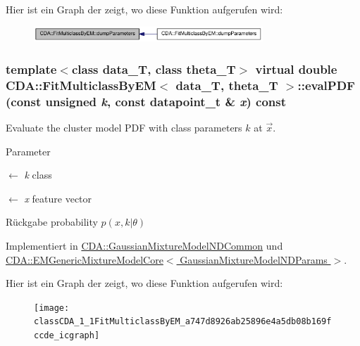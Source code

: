 Hier ist ein Graph der zeigt, wo diese Funktion aufgerufen wird:\nopagebreak
\begin{figure}[H]
\begin{center}
\leavevmode
\includegraphics[width=244pt]{classCDA_1_1FitMulticlassByEM_aa5598f1ced5c95045f59c99610ab53e5_icgraph}
\end{center}
\end{figure}


\hypertarget{classCDA_1_1FitMulticlassByEM_a747d8926ab25896e4a5db08b169fccde}{
\subsubsection[{evalPDF}]{\setlength{\rightskip}{0pt plus 5cm}template$<$class data\_\-T, class theta\_\-T$>$ virtual double {\bf CDA::FitMulticlassByEM}$<$ data\_\-T, theta\_\-T $>$::evalPDF (const unsigned {\em k}, \/  const datapoint\_\-t \& {\em x}) const}}
\label{classCDA_1_1FitMulticlassByEM_a747d8926ab25896e4a5db08b169fccde}


Evaluate the cluster model PDF with class parameters $k$ at $\vec{x}$. 


\begin{DoxyParams}{Parameter}
\item[\mbox{$\leftarrow$} {\em k}]class \item[\mbox{$\leftarrow$} {\em x}]feature vector\end{DoxyParams}
\begin{DoxyReturn}{Rückgabe}
probability $p(x,k\vert\theta)$ 
\end{DoxyReturn}


Implementiert in \hyperlink{classCDA_1_1GaussianMixtureModelNDCommon_aeac07962bd15c826561c68af7ac9c6d1}{CDA::GaussianMixtureModelNDCommon} und \hyperlink{classCDA_1_1EMGenericMixtureModelCore_ad8722983ea6f58d6e0b4a6bd117b050a}{CDA::EMGenericMixtureModelCore$<$ GaussianMixtureModelNDParams $>$}.



Hier ist ein Graph der zeigt, wo diese Funktion aufgerufen wird:\nopagebreak
\begin{figure}[H]
\begin{center}
\leavevmode
\texttt{[image: classCDA\_1\_1FitMulticlassByEM\_a747d8926ab25896e4a5db08b169fccde\_icgraph]}
\end{center}
\end{figure}


